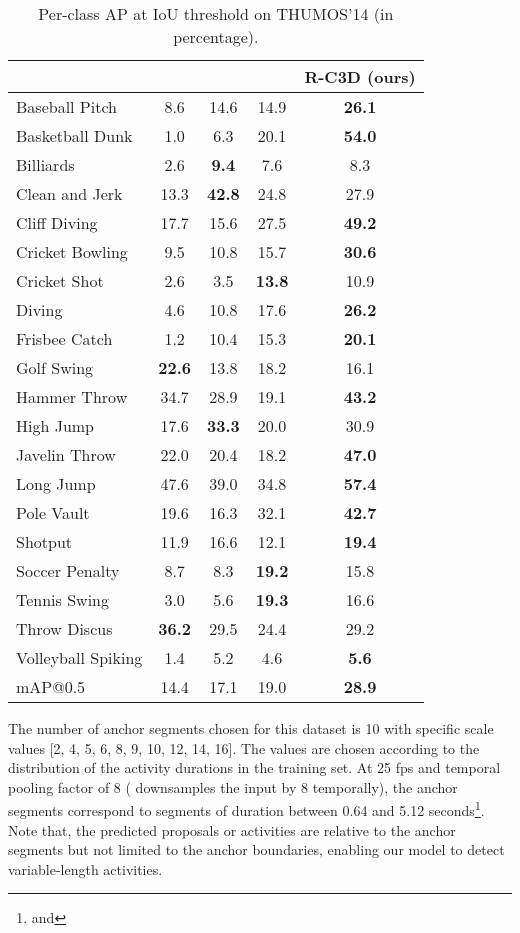 \documentclass[10pt,twocolumn,letterpaper]{article}
\begin{document}
\begin{table}[!t]
\centering
\caption{Per-class AP at IoU threshold  on THUMOS'14 (in percentage).}
\small
 \begin{tabular}{l || c c c c} 
 \hline
 ~ & \cite{oneata2014lear} & \cite{yeung2016end} &  \cite{shou2016temporal} & R-C3D (ours)\\ \hline
 Baseball Pitch  & 8.6 & 14.6 & 14.9&  \bf{26.1}  \\ Basketball Dunk & 1.0 & 6.3 &20.1 & \bf{54.0}  \\ Billiards & 2.6 & \bf{9.4} & 7.6 & 8.3  \\ Clean and Jerk  & 13.3 & \bf{42.8} &24.8 & 27.9  \\ Cliff Diving    & 17.7 & 15.6 &27.5 & \bf{49.2}  \\ Cricket Bowling & 9.5 & 10.8 & 15.7& \bf{30.6}  \\ Cricket Shot    & 2.6 & 3.5 &\bf{13.8} & 10.9  \\ Diving & 4.6    & 10.8 & 17.6 & \bf{26.2}  \\ Frisbee Catch   & 1.2 & 10.4 &15.3 & \bf{20.1}  \\ Golf Swing      & \bf{22.6}  & 13.8 &18.2 & 16.1  \\ Hammer Throw    & 34.7 & 28.9 &19.1 & \bf{43.2}  \\ High Jump       & 17.6 & \bf{33.3} &20.0 & 30.9 \\ Javelin Throw   & 22.0 & 20.4 &18.2 & \bf{47.0}  \\ Long Jump       & 47.6 & 39.0 &34.8 & \bf{57.4}  \\ Pole Vault      & 19.6 & 16.3 &32.1 & \bf{42.7}  \\ Shotput & 11.9  & 16.6 &12.1 & \bf{19.4}  \\ Soccer Penalty  & 8.7 & 8.3 &\bf{19.2} & 15.8  \\ Tennis Swing    & 3.0 & 5.6 &\bf{19.3} & 16.6  \\ Throw Discus    & \bf{36.2} & 29.5 &24.4 & 29.2 \\ Volleyball Spiking & 1.4 & 5.2 &4.6 & \bf{5.6} \\ \hline

 mAP@0.5 &14.4 & 17.1 & 19.0 & \bf{28.9} \\ \hline 
 \end{tabular}
\label{tab:per_class_ap}
\vspace{-0.2in}
\end{table}

The number of anchor segments  chosen for this dataset is 10 with specific scale values [2, 4, 5, 6, 8, 9, 10, 12, 14, 16].
The values are chosen according to the distribution of the activity durations in the training set.
At 25 fps and temporal pooling factor of 8 ( downsamples the input by 8 temporally), the anchor segments correspond to segments of duration  between 0.64 and 5.12 seconds\footnote{ and }.
Note that, the predicted proposals or activities are relative to the anchor segments but not limited to the anchor boundaries, enabling our model to detect variable-length activities.
\end{document}
